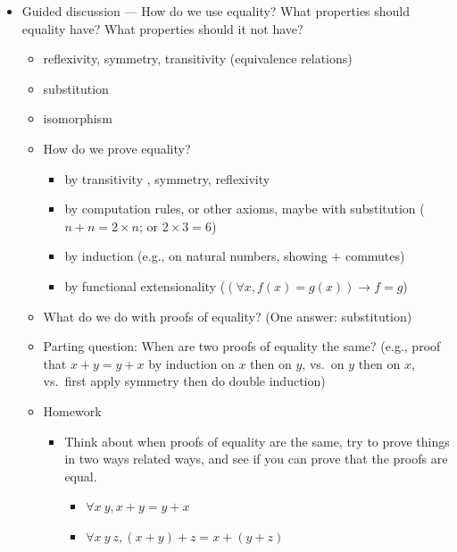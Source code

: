 \documentclass{article}
\begin{document}
\begin{itemize}
  \item
    Guided discussion --- How do we use equality?  What properties should equality have?  What properties should it not have?
    \begin{itemize}
      \item reflexivity, symmetry, transitivity (equivalence relations)
      \item substitution
      \item isomorphism
      \item How do we prove equality?
      \begin{itemize}
        \item by transitivity%
        , symmetry, reflexivity
        \item by computation rules, or other axioms, maybe with substitution ($n + n = 2 \times n$; or $2 \times 3 = 6$)
        \item by induction (e.g., on natural numbers, showing $+$ commutes)
        \item by functional extensionality ($(\forall x, f(x) = g(x)) \to f = g$)
      \end{itemize}
      \item What do we do with proofs of equality?  (One answer: substitution)
      \item Parting question: When are two proofs of equality the same? (e.g., proof that $x + y = y + x$ by induction on $x$ then on $y$, vs.~on $y$ then on $x$, vs.~first apply symmetry then do double induction)
      \item Homework
      \begin{itemize}
        \item Think about when proofs of equality are the same, try to prove things in two ways related ways, and see if you can prove that the proofs are equal.
        \begin{itemize}
          \item $\forall x\ y, x + y = y + x$
          \item $\forall x\ y\ z, (x + y) + z = x + (y + z)$
        \end{itemize}

\end{itemize}
\end{itemize}
\end{itemize}
\end{document}
